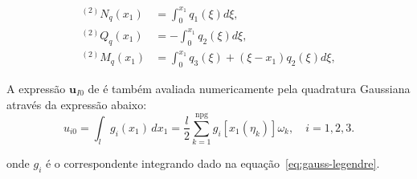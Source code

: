 \begin{align}
^{(2)}N_q(x_1)       & = \int_0^{x_1} q_1(\xi)d\xi,                     \\
                    ^{(2)}Q_q(x_1) & = -\int_0^{x_1} q_2(\xi)d\xi,                    \\
                    ^{(2)}M_q(x_1) & = \int_0^{x_1} q_3(\xi) + (\xi-x_1)q_2(\xi)d\xi,
\end{align}

A expressão $\mathbf{u}_{I0}$ de é também avaliada numericamente pela quadratura Gaussiana através da expressão abaixo:
\begin{equation}
	u_{i0}
	=
	\int_l g_i(x_1)\,dx_1
	=
	\dfrac{l}{2} \sum_{k=1}^{\textrm{npg}} g_i[x_1(\eta_k)]\omega_k, \quad
	i=1,2,3.
\end{equation}

onde $g_i$ é o correspondente integrando dado na equação~\ref{eq:gauss-legendre}.
